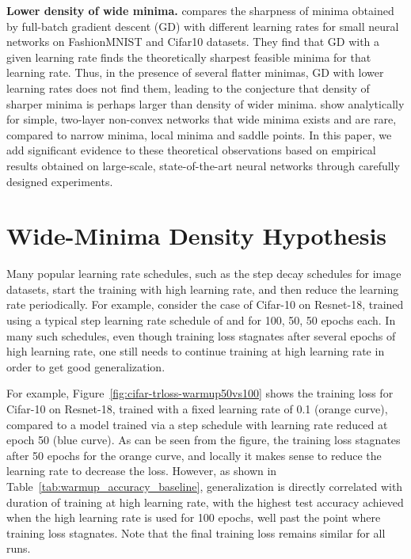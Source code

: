 \documentclass[twoside,11pt]{article}
\begin{document}
\noindent
{\bf Lower density of wide minima.} \citet{wu2018sgd} compares the sharpness of minima obtained by full-batch gradient descent (GD) with different learning rates for small neural networks on FashionMNIST and Cifar10 datasets. They find that GD with a given learning rate finds the theoretically sharpest feasible minima for that learning rate. Thus, in the presence of several flatter minimas, GD with lower learning rates does not find them, leading to the conjecture that density of sharper minima is perhaps larger than density of wider minima. \citet{baldassi2020shaping} show analytically for simple, two-layer non-convex networks that wide minima exists and are rare, compared to narrow minima, local minima and saddle points. In this paper, we add significant evidence to these theoretical observations based on empirical results obtained on large-scale, state-of-the-art neural networks through carefully designed experiments. \section{Wide-Minima Density Hypothesis}
\label{sec:wide_minima_hypothesis}

Many popular learning rate schedules, such as the step decay schedules for image datasets, start the training with high learning rate, and then reduce the learning rate periodically. For example, consider the case of Cifar-10 on Resnet-18, trained using a typical step learning rate schedule of  and   for 100, 50, 50 epochs each. In many such schedules, even though training loss stagnates after several epochs of high learning rate, one still needs to continue training at high learning rate in order to get good generalization. 

For example, Figure~\ref{fig:cifar-trloss-warmup50vs100} shows the training loss for Cifar-10 on Resnet-18, trained with a fixed learning rate of 0.1 (orange curve), compared to a model trained via a step schedule with learning rate reduced at epoch 50 (blue curve). As can be seen from the figure, the training loss stagnates after  50 epochs for the orange curve, and locally it makes sense to reduce the learning rate to decrease the loss. However, as shown in Table~\ref{tab:warmup_accuracy_baseline}, generalization is directly correlated with duration of training at high learning rate, with the highest test accuracy achieved when the high learning rate is used for 100 epochs, well past the point where training loss stagnates. Note that the final training loss remains similar for all runs.
\end{document}
